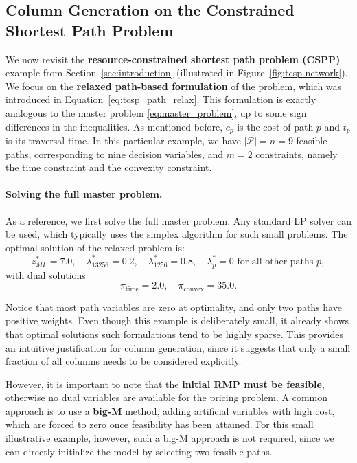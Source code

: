 \documentclass{book}
\theoremstyle{definition}
\newcounter{algorithm_}
\numberwithin{algorithm_}{chapter}
\begin{document}
\newpage

\subsection{Column Generation on the Constrained Shortest Path Problem}
\label{subsec:cg_example}

We now revisit the \textbf{resource-constrained shortest path problem (CSPP)} example from Section~\ref{sec:introduction} (illustrated in Figure~\ref{fig:tcsp-network}). We focus on the \textbf{relaxed path-based formulation} of the problem, which was introduced in Equation~\eqref{eq:tcsp_path_relax}. This formulation is exactly analogous to the master problem \eqref{eq:master_problem}, up to some sign differences in the inequalities.  
As mentioned before, $c_p$ is the cost of path $p$ and $t_p$ is its traversal time. In this particular example, we have $|\mathcal{P}| = n = 9$ feasible paths, corresponding to nine decision variables, and $m = 2$ constraints, namely the time constraint and the convexity constraint.


\paragraph{Solving the full master problem.}  
As a reference, we first solve the full master problem. Any standard LP solver can be used, which typically uses the simplex algorithm for such small problems. The optimal solution of the relaxed problem is:
\[
z_{MP}^* = 7.0, \quad 
\lambda^*_{13256} = 0.2, \quad 
\lambda^*_{1256} = 0.8, \quad 
\lambda^*_p = 0 \text{ for all other paths } p,
\]
with dual solutions
\[
\pi_{\text{time}} = 2.0, \quad \pi_{\text{convex}} = 35.0.
\]

Notice that most path variables are zero at optimality, and only two paths have positive weights. Even though this example is deliberately small, it already shows that optimal solutions such formulations tend to be highly sparse. This provides an intuitive justification for column generation, since it suggests that only a small fraction of all columns needs to be considered explicitly.

However, it is important to note that the \textbf{initial RMP must be feasible}, otherwise no dual variables are available for the pricing problem.  
A common approach is to use a \textbf{big-M} method, adding artificial variables with high cost, which are forced to zero once feasibility has been attained. For this small illustrative example, however, such a big-M approach is not required, since we can directly initialize the model by selecting two feasible paths.
\end{document}
